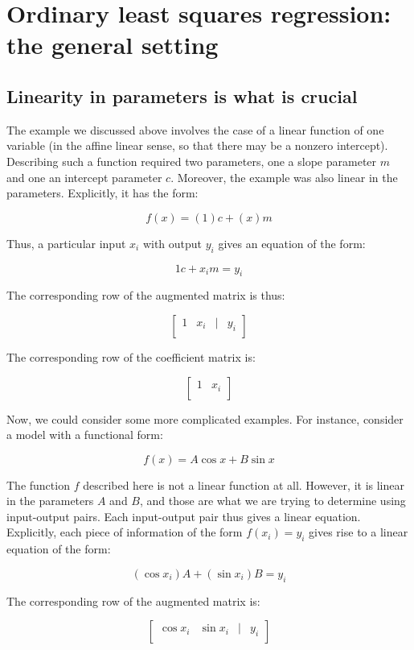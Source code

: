 \documentclass[10pt]{amsart}
\begin{document}
\section{Ordinary least squares regression: the general setting}

\subsection{Linearity in parameters is what is crucial}

The example we discussed above involves the case of a linear function
of one variable (in the affine linear sense, so that there may be a
nonzero intercept). Describing such a function required two
parameters, one a slope parameter $m$ and one an intercept parameter
$c$. Moreover, the example was also linear in the
parameters. Explicitly, it has the form:

$$f(x) = (1)c + (x)m$$

Thus, a particular input $x_i$ with output $y_i$ gives an equation of
the form:

$$1c + x_im= y_i$$

The corresponding row of the augmented matrix is thus:

$$\left[\begin{matrix} 1 & x_i & \mid & y_i \\\end{matrix}\right]$$

The corresponding row of the coefficient matrix is:

$$\left[\begin{matrix} 1 & x_i \\\end{matrix}\right]$$

Now, we could consider some more complicated examples. For instance,
consider a model with a functional form:

$$f(x) = A \cos x + B \sin x$$

The function $f$ described here is not a linear function at
all. However, it is linear in the parameters $A$ and $B$, and those
are what we are trying to determine using input-output pairs. Each
input-output pair thus gives a linear equation. Explicitly, each piece
of information of the form $f(x_i) = y_i$ gives rise to a linear
equation of the form:

$$(\cos x_i) A + (\sin x_i) B = y_i$$

The corresponding row of the augmented matrix is:

$$\left[\begin{matrix} \cos x_i & \sin x_i & \mid & y_i \\\end{matrix}\right]$$
\end{document}
